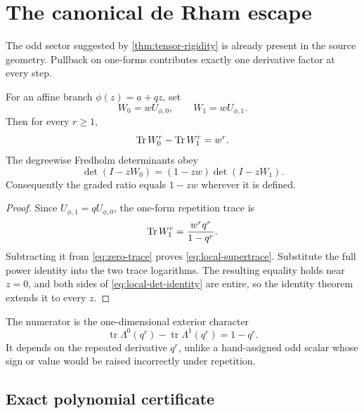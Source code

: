 \section{The canonical de Rham escape}
\label{sec:escape}

The odd sector suggested by \cref{thm:tensor-rigidity} is already present in
the source geometry.  Pullback on one-forms contributes exactly one
derivative factor at every step.

\begin{theorem}
\label{thm:local-cancellation}
For an affine branch \(\phi(z)=a+qz\), set
\[
        W_0=wU_{\phi,0},\qquad W_1=wU_{\phi,1}.
\]
Then for every \(r\ge1\),
\begin{equation}
        \operatorname{Tr} W_0^r-\operatorname{Tr} W_1^r=w^r.
 \label{eq:local-supertrace}
\end{equation}
The degreewise Fredholm determinants obey
\begin{equation}
 \det(I-zW_0)=(1-zw)\det(I-zW_1).
 \label{eq:local-det-identity}
\end{equation}
Consequently the graded ratio equals \(1-zw\) wherever it is defined.
\end{theorem}

\begin{proof}
Since \(U_{\phi,1}=qU_{\phi,0}\), the one-form repetition trace is
\[
        \operatorname{Tr} W_1^r=\frac{w^rq^r}{1-q^r}.
\]
Subtracting it from \eqref{eq:zero-trace} proves
\eqref{eq:local-supertrace}.  Substitute the full power identity into the
two trace logarithms.  The resulting equality holds near \(z=0\), and both
sides of \eqref{eq:local-det-identity} are entire, so the identity theorem
extends it to every \(z\).
\end{proof}

The numerator is the one-dimensional exterior character
\begin{equation}
 \operatorname{tr}\Lambda^0(q^r)-
 \operatorname{tr}\Lambda^1(q^r)=1-q^r.
 \label{eq:exterior-character}
\end{equation}
It depends on the repeated derivative \(q^r\), unlike a hand-assigned odd
scalar whose sign or value would be raised incorrectly under repetition.

\subsection{Exact polynomial certificate}

